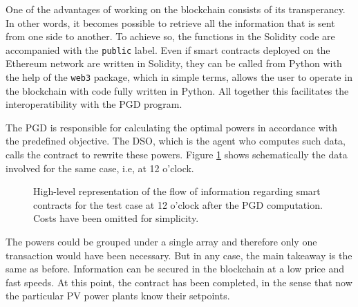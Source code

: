 One of the advantages of working on the blockchain consists of its transperancy. In other words, it becomes possible to retrieve all the information that is sent from one side to another. To achieve so, the functions in the Solidity code are accompanied with the \texttt{public} label. Even if smart contracts deployed on the Ethereum network are written in Solidity, they can be called from Python with the help of the \texttt{web3} package, which in simple terms, allows the user to operate in the blockchain with code fully written in Python. All together this facilitates the interoperatibility with the PGD program. 

The PGD is responsible for calculating the optimal powers in accordance with the predefined objective. The DSO, which is the agent who computes such data, calls the contract to rewrite these powers. Figure \ref{fig:smarts2_2} shows schematically the data involved for the same case, i.e, at 12 o'clock.

\begin{figure}[!htb]\centering
    \caption{High-level representation of the flow of information regarding smart contracts for the test case at 12 o'clock after the PGD computation. Costs have been omitted for simplicity.}
    \label{fig:smarts2_2}
\end{figure}
The powers could be grouped under a single array and therefore only one transaction would have been necessary. But in any case, the main takeaway is the same as before. Information can be secured in the blockchain at a low price and fast speeds. At this point, the contract has been completed, in the sense that now the particular PV power plants know their setpoints. 



